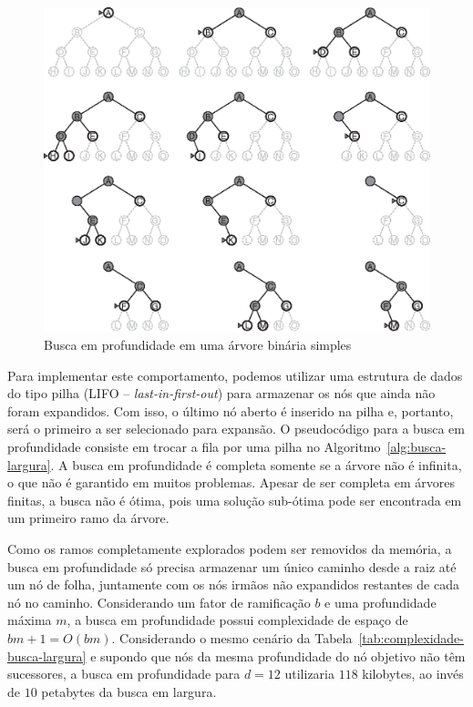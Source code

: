 \begin{figure}[h]
	\centering
	\includegraphics[width=\textwidth]{img/busca-profundidade}
	\caption{Busca em profundidade em uma árvore binária simples}
	\label{fig:busca-profundidade}
\end{figure}

Para implementar este comportamento, podemos utilizar uma estrutura de dados do tipo pilha (LIFO -- \textit{last-in-first-out}) para armazenar os nós que ainda não foram expandidos. Com isso, o último nó aberto é inserido na pilha e, portanto, será o primeiro a ser selecionado para expansão. O pseudocódigo para a busca em profundidade consiste em trocar a fila por uma pilha no Algoritmo~\ref{alg:busca-largura}. A busca em profundidade é completa somente se a árvore não é infinita, o que não é garantido em muitos problemas. Apesar de ser completa em árvores finitas, a busca não é ótima, pois uma solução sub-ótima pode ser encontrada em um primeiro ramo da árvore.

Como os ramos completamente explorados podem ser removidos da memória, a busca em profundidade só precisa armazenar um único caminho desde a raiz até um nó de folha, juntamente com os nós irmãos não expandidos restantes de cada nó no caminho. Considerando um fator de ramificação $b$ e uma profundidade máxima $m$, a busca em profundidade possui complexidade de espaço de $bm + 1 = O(bm)$. Considerando o mesmo cenário da Tabela~\ref{tab:complexidade-busca-largura} e supondo que nós da mesma profundidade do nó objetivo não têm sucessores, a busca em profundidade para $d = 12$ utilizaria $118$ kilobytes, ao invés de $10$ petabytes da busca em largura.

